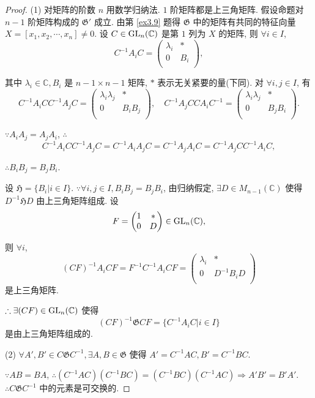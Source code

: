\documentclass[color=black,device=normal,lang=cn,mode=geye]{elegantnote}
\begin{document}
\begin{proof}
    (1) 对矩阵的阶数 $n$ 用数学归纳法. $1$ 阶矩阵都是上三角矩阵. 假设命题对 $n-1$ 阶矩阵构成的 $\mathfrak{G}'$ 成立. 由第 \ref{ex3.9} 题得 $\mathfrak{G}$ 中的矩阵有共同的特征向量 $X=[x_1,x_2,\cdots,x_n]\neq0$. 设 $C\in\operatorname{GL} _n(\mathbb{C})$ 是第 $1$ 列为 $X$ 的矩阵, 则 $\forall i\in I$,
    \[C^{-1}A_iC=\begin{pmatrix}
        \lambda_i & * \\
        0 & B_i \\
    \end{pmatrix},\]

    其中 $\lambda_i\in\mathbb{C},B_i$ 是 $n-1\times n-1$ 矩阵, $*$ 表示无关紧要的量(下同). 对 $\forall i,j\in I$, 有
    \[C^{-1}A_iCC^{-1}A_jC=\begin{pmatrix}
        \lambda_i\lambda_j & * \\
        0 & B_iB_j \\
    \end{pmatrix},\quad C^{-1}A_jCCA_iC^{-1}=\begin{pmatrix}
        \lambda_i\lambda_j & * \\
        0 & B_jB_i \\
    \end{pmatrix}.\]

    $\because A_iA_j=A_jA_i$, $\therefore$
    \[C^{-1}A_iCC^{-1}A_jC=C^{-1}A_iA_jC=C^{-1}A_jA_iC=C^{-1}A_jCC^{-1}A_iC,\]

    $\therefore B_iB_j=B_jB_i$.

    设 $\mathfrak{H}=\{B_i|i\in I\}$. $\because\forall i,j\in I,B_iB_j=B_jB_i$, 由归纳假定, $\exists D\in M_{n-1}(\mathbb{C})$ 使得 $D^{-1}\mathfrak{H}D$ 由上三角矩阵组成. 设
    \[F=\begin{pmatrix}
        1 & * \\
        0 & D \\
    \end{pmatrix}\in\operatorname{GL} _n(\mathbb{C}),\]

    则 $\forall i$,
    \[(CF)^{-1}A_iCF=F^{-1}C^{-1}A_iCF=\begin{pmatrix}
        \lambda_i & * \\
        0 & D^{-1}B_iD \\
    \end{pmatrix}\]
    是上三角矩阵.

    $\therefore\exists(CF)\in\operatorname{GL} _n(\mathbb{C})$ 使得
    \[(CF)^{-1}\mathfrak{G}CF=\{C^{-1}A_iC|i\in I\}\]
    是由上三角矩阵组成的.

    (2) $\forall A',B'\in C\mathfrak{G}C^{-1},\exists A,B\in\mathfrak{G}$ 使得 $A'=C^{-1}AC,B'=C^{-1}BC$.
    
    $\because AB=BA$, $\therefore(C^{-1}AC)(C^{-1}BC)=(C^{-1}BC)(C^{-1}AC)\Rightarrow A'B'=B'A'$. $\therefore C\mathfrak{G}C^{-1}$ 中的元素是可交换的.
\end{proof}
\end{document}

